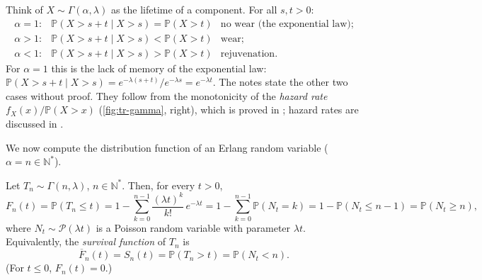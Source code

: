 \begin{remark}[Ageing]\label{rem:tr-ageing}
Think of $X\sim\Gamma(\alpha,\lambda)$ as the lifetime of a component. For all $s,t>0$:
\[
\begin{array}{lll}
  \alpha=1: & \mathbb P(X>s+t\mid X>s)=\mathbb P(X>t) & \text{no wear (the exponential law)};\\[2pt]
  \alpha>1: & \mathbb P(X>s+t\mid X>s)<\mathbb P(X>t) & \text{wear};\\[2pt]
  \alpha<1: & \mathbb P(X>s+t\mid X>s)>\mathbb P(X>t) & \text{rejuvenation}.
\end{array}
\]
For $\alpha=1$ this is the lack of memory of the exponential law:
$\mathbb P(X>s+t\mid X>s)=e^{-\lambda(s+t)}/e^{-\lambda s}=e^{-\lambda t}$. The notes state the
other two cases without proof. They follow from the monotonicity of the \emph{hazard rate}
$f_X(x)/\mathbb P(X>x)$ (\cref{fig:tr-gamma}, right), which is proved in ;
hazard rates are discussed in \citet[Chapter~5]{ross-5}.
\end{remark}

We now compute the distribution function of an Erlang random variable ($\alpha=n\in\mathbb N^*$).

\begin{proposition}\label{prop:tr-erlang}
Let $T_n\sim\Gamma(n,\lambda)$, $n\in\mathbb N^*$. Then, for every $t>0$,
\[
  F_n(t)=\mathbb P(T_n\le t)=1-\sum_{k=0}^{n-1}\frac{(\lambda t)^k}{k!}\,e^{-\lambda t}
  =1-\sum_{k=0}^{n-1}\mathbb P(N_t=k)=1-\mathbb P(N_t\le n-1)=\mathbb P(N_t\ge n),
\]
where $N_t\sim\mathcal P(\lambda t)$ is a Poisson random variable with parameter $\lambda t$.
Equivalently, the \emph{survival function} of $T_n$ is
\[
  \overline F_n(t)=S_n(t)=\mathbb P(T_n>t)=\mathbb P(N_t<n).
\]
(For $t\le0$, $F_n(t)=0$.)
\end{proposition}

